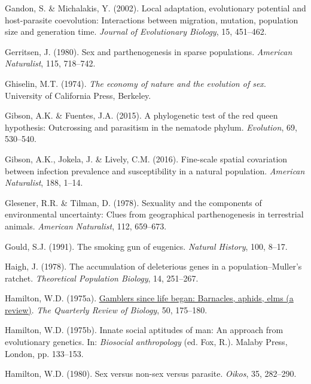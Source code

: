 \documentclass[
  american,
  letterpaper,
]{book}
\newlength{\cslhangindent}
\newenvironment{CSLReferences}[2] %
 {\begin{list}{}{%
  \setlength{\itemindent}{0pt}
  \setlength{\leftmargin}{0pt}
  \setlength{\parsep}{0pt}
  \ifodd #1
   \setlength{\leftmargin}{\cslhangindent}
   \setlength{\itemindent}{-1\cslhangindent}
  \fi
  \setlength{\itemsep}{#2\baselineskip}}}
 {\end{list}}
\begin{document}
\begin{CSLReferences}{1}{0}
Gandon, S. \& Michalakis, Y. (2002). Local adaptation, evolutionary
potential and host-parasite coevolution: Interactions between migration,
mutation, population size and generation time. \emph{Journal of
Evolutionary Biology}, 15, 451--462.

Gerritsen, J. (1980). Sex and parthenogenesis in sparse populations.
\emph{American Naturalist}, 115, 718--742.

Ghiselin, M.T. (1974). \emph{The economy of nature and the evolution of
sex}. University of California Press, Berkeley.

Gibson, A.K. \& Fuentes, J.A. (2015). A phylogenetic test of the red
queen hypothesis: Outcrossing and parasitism in the nematode phylum.
\emph{Evolution}, 69, 530--540.

Gibson, A.K., Jokela, J. \& Lively, C.M. (2016). Fine-scale spatial
covariation between infection prevalence and susceptibility in a natural
population. \emph{American Naturalist}, 188, 1--14.

Glesener, R.R. \& Tilman, D. (1978). Sexuality and the components of
environmental uncertainty: Clues from geographical parthenogenesis in
terrestrial animals. \emph{American Naturalist}, 112, 659--673.

Gould, S.J. (1991). The smoking gun of eugenics. \emph{Natural History},
100, 8--17.

Haigh, J. (1978). The accumulation of deleterious genes in a
population--{Muller's} ratchet. \emph{Theoretical Population Biology},
14, 251--267.

Hamilton, W.D. (1975a). \href{https://doi.org/10.1086/408439}{Gamblers
since life began: Barnacles, aphids, elms (a review)}. \emph{The
Quarterly Review of Biology}, 50, 175--180.

Hamilton, W.D. (1975b). Innate social aptitudes of man: An approach from
evolutionary genetics. In: \emph{Biosocial anthropology} (ed. Fox, R.).
Malaby Press, London, pp. 133--153.

Hamilton, W.D. (1980). Sex versus non-sex versus parasite. \emph{Oikos},
35, 282--290.


\end{CSLReferences}
\end{document}
